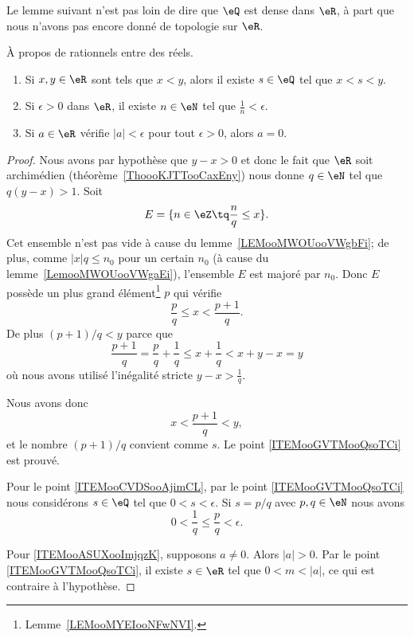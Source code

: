 Le lemme suivant n'est pas loin de dire que \( \eQ\) est dense dans \( \eR\), à part que nous n'avons pas encore donné de topologie sur \( \eR\).
\begin{lemma}       \label{LemooHLHTooTyCZYL}
	À propos de rationnels entre des réels.
	\begin{enumerate}
		\item       \label{ITEMooGVTMooQsoTCi}
		      Si \( x,y\in \eR\) sont tels que \( x<y\), alors il existe \( s\in \eQ\) tel que \( x<s<y\).
		\item       \label{ITEMooCVDSooAjimCL}
		      Si \( \epsilon>0\) dans \( \eR\), il existe \( n\in \eN\) tel que  \( \frac{1}{ n }<\epsilon\).
		\item		\label{ITEMooASUXooImjqzK}
		      Si \( a\in \eR\) vérifie \( | a |<\epsilon\) pour tout \( \epsilon>0\), alors \( a=0\).
	\end{enumerate}
\end{lemma}

\begin{proof}
	Nous avons par hypothèse que \( y-x>0\) et donc le fait que \( \eR\) soit archimédien (théorème~\ref{ThoooKJTTooCaxEny}) nous donne \( q\in \eN\) tel que \( q(y-x)>1\). Soit
	\begin{equation}
		E=\{ n\in \eZ\tq \frac{ n }{ q }\leq x \}.
	\end{equation}
	Cet ensemble n'est pas vide à cause du lemme~\ref{LEMooMWOUooVWgbFi}; de plus, comme \( |x|q \leq n_0\) pour un certain \( n_0 \) (à cause du lemme~\ref{LemooMWOUooVWgaEi}), l'ensemble \( E\) est majoré par \( n_0\). Donc \( E\) possède un plus grand élément\footnote{Lemme~\ref{LEMooMYEIooNFwNVI}.} \( p\) qui vérifie
	\begin{equation}
		\frac{ p }{ q }\leq x<\frac{ p+1 }{ q }.
	\end{equation}
	De plus \( (p+1)/q<y\) parce que
	\begin{equation}
		\frac{ p+1 }{ q }=\frac{ p }{ q }+\frac{1}{ q }\leq x+\frac{1}{ q }<x+y-x=y
	\end{equation}
	où nous avons utilisé l'inégalité stricte \( y-x>\frac{1}{ q }\).

	Nous avons donc
	\begin{equation}
		x<\frac{ p+1 }{ q }<y,
	\end{equation}
	et le nombre \( (p+1)/q\) convient comme \( s\). Le point \ref{ITEMooGVTMooQsoTCi} est prouvé.

	Pour le point \ref{ITEMooCVDSooAjimCL}, par le point \ref{ITEMooGVTMooQsoTCi} nous considérons \( s\in \eQ\) tel que \( 0<s<\epsilon\). Si \( s=p/q\) avec \( p,q\in \eN\) nous avons
	\begin{equation}
		0<\frac{1}{ q }\leq \frac{ p }{ q }<\epsilon.
	\end{equation}

	Pour \ref{ITEMooASUXooImjqzK}, supposons \( a\neq 0\). Alors \( | a |>0\). Par le point \ref{ITEMooGVTMooQsoTCi}, il existe \( s\in \eR\) tel que \(0<m<| a | \), ce qui est contraire à l'hypothèse.
\end{proof}

